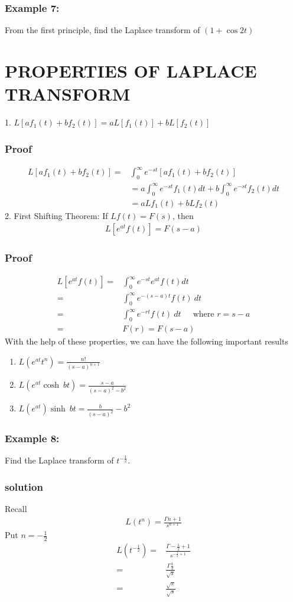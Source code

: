 \documentclass[12pt]{report}
\begin{document}
\subsubsection{Example 7:}
From the first principle, find the Laplace transform of $(1+\cos 2t)$

\section{PROPERTIES OF LAPLACE TRANSFORM}
1. $L[af_1(t)+bf_2(t)]=aL[f_1(t)]+bL[f_2(t)]$
\subsubsection{Proof}
\begin{align*}
L[af_1(t)+bf_2(t)]= &\int_0^\infty e^{-st}[af_1(t)+bf_2(t)] \\
& = a \int_0^\infty e^{-st}f_1(t)dt + b\int_0^\infty e^{-st}f_2(t)dt \\
& = aLf_1(t)+bLf_2(t)
\end{align*}
2. First Shifting Theorem: If $Lf(t)=F(s)$, then
\begin{align*}
L[e^{at}f(t)]=F(s-a)
\end{align*}
\subsubsection{Proof}
\begin{align*}
L[e^{at}f(t)]=& \int_0^\infty e^{-st} e^{at}f(t)dt \\
=&\int_0^\infty e^{-(s-a)t}f(t)~dt \\
=& \int_0^\infty e^{-rt}f(t)~dt ~~~~~\mbox{ where } r=s-a \\
=& F(r)=F(s-a)
\end{align*}
With the help of these properties, we can have the following important results
\begin{enumerate}
	\item $L(e^{at}t^n)=\frac{n!}{(s-a)^{n+1}}$
  \item $L(e^{at} \cosh~bt)=\frac{s-a}{(s-a)^2-b^2}$
  \item $L(e^{at}) \sinh~bt=\frac{b}{(s-a)^2}-b^2$
\end{enumerate}
\subsubsection{Example 8:} 
Find the Laplace transform of $t^{-\frac{1}{2}}$.
\subsubsection{solution}
Recall
\begin{align*}
L(t^n)=\frac{\Gamma n+1}{s^{n+1}}
\end{align*}
Put $n=-\frac{1}{2}$
\begin{align*}
L(t^{-\frac{1}{2}})=&\frac{\Gamma -\frac{1}{2}+1}{s^{-\frac{1}{2}+1}} \\
=&\frac{\Gamma \frac{1}{2}}{\sqrt{s}} \\
=& \frac{\sqrt{\pi}}{\sqrt{s}}
\end{align*}
\end{document}

